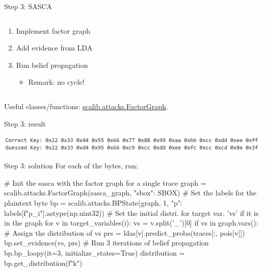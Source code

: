 \documentclass[aspectratio=169]{beamer}
\begin{document}
\begin{frame}{Step 3: SASCA}
    \begin{columns}
        \begin{column}{0.4\textwidth}
            \begin{enumerate}
                \item Implement factor graph
                \item Add evidence from LDA
                \item Run belief propagation
                    \begin{itemize}
                        \item Remark: no cycle!
                    \end{itemize}
            \end{enumerate}
        \end{column}
        \begin{column}{0.5\textwidth}
            \resizebox{\textwidth}{!}{
                \begin{tikzpicture}
                    
                \end{tikzpicture}
            }
        \end{column}
    \end{columns}

    Useful classes/functions:
    \href{https://scalib.readthedocs.io/en/stable/source/api/scalib.attacks.FactorGraph.html}{scalib.attacks.FactorGraph}.
\end{frame}
\begin{frame}{Step 3: result}
    \begin{center}
        \includegraphics[width=\textwidth]{figures/res_step3.png}
    \end{center}
\end{frame}
\begin{frame}[containsverbatim]{Step 3: solution}
For each of the bytes, run:
\begin{python}
# Init the sasca with the factor graph for a single trace
graph = scalib.attacks.FactorGraph(sasca_graph, {"sbox": SBOX})
# Set the labels for the plaintext byte
bp = scalib.attacks.BPState(graph, 1, {"p": labels[f"p_{i}"].astype(np.uint32)})
# Set the initial distri. for target var. 'vs' if it is in the graph
for v in target_variables(i):
    vs = v.split('_')[0]
    if vs in graph.vars():
        # Assign the distribution of vs
        prs = ldas[v].predict_proba(traces[:, pois[v]])
        bp.set_evidence(vs, prs)
# Run 3 iterations of belief propagation
bp.bp_loopy(it=3, initialize_states=True)
distribution = bp.get_distribution(f"k")
\end{python}
\end{frame}
\end{document}
